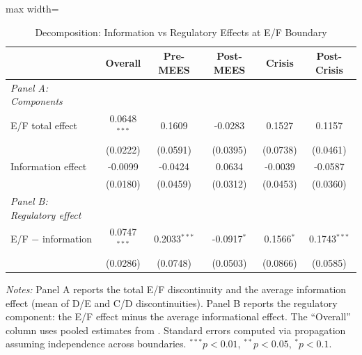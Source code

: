 \begin{table}[htbp]
\centering
\caption{Decomposition: Information vs Regulatory Effects at E/F Boundary}
\label{tab:decomposition}
\begin{adjustbox}{max width=\textwidth}
\begin{tabular}{lccccc}
\toprule
 & Overall & Pre-MEES & Post-MEES & Crisis & Post-Crisis \\
\midrule
\textit{Panel A: Components} & & & & & \\
\quad E/F total effect & 0.0648$^{***}$ & 0.1609 & -0.0283 & 0.1527 & 0.1157 \\
 & (0.0222) & (0.0591) & (0.0395) & (0.0738) & (0.0461) \\
\addlinespace
\quad Information effect & -0.0099 & -0.0424 & 0.0634 & -0.0039 & -0.0587 \\
 & (0.0180) & (0.0459) & (0.0312) & (0.0453) & (0.0360) \\
\addlinespace
\textit{Panel B: Regulatory effect} & & & & & \\
\quad E/F $-$ information & 0.0747$^{***}$ & 0.2033$^{***}$ & -0.0917$^{*}$ & 0.1566$^{*}$ & 0.1743$^{***}$ \\
 & (0.0286) & (0.0748) & (0.0503) & (0.0866) & (0.0585) \\
\bottomrule
\end{tabular}
\end{adjustbox}
\begin{minipage}{\textwidth}
\footnotesize
\textit{Notes:} Panel A reports the total E/F discontinuity and the average information effect
(mean of D/E and C/D discontinuities). Panel B reports the regulatory component:
the E/F effect minus the average informational effect. The ``Overall'' column uses pooled estimates from . Standard errors computed via
propagation assuming independence across boundaries.
$^{***}p<0.01$, $^{**}p<0.05$, $^{*}p<0.1$.
\end{minipage}
\end{table}
